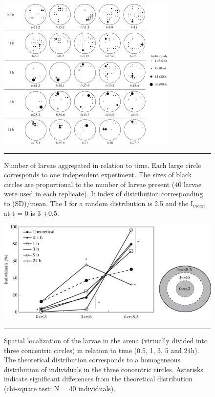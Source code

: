 \begin{figure}[h]
	\centering
		\includegraphics[width=0.9 \textwidth]{Figures/agreg_animbehav.pdf}
		\rule{35em}{0.5pt}
	\caption[Agregation]{Number of larvae aggregated in relation to time. Each large circle corresponds to one independent experiment. The sizes of black circles are proportional to the number of larvae present (40 larvae were used in each replicate). I: index of distribution corresponding to (SD)/mean. The I for a random distribution is 2.5 and the I$_{mean}$ at t = 0 is 3 $\pm$0.5.}
	\label{fig:agreg}

\end{figure}

\clearpage

\begin{figure}[t]
\centering
		\includegraphics[width=0.8 \textwidth]{Figures/rad_animbehav.png}
		\rule{35em}{0.5pt}
		\caption[Radial]{Spatial localization of the larvae in the arena (virtually divided into three concentric circles) in relation to time (0.5, 1, 3, 5 and 24h). The theoretical distribution corresponds to a homogeneous distribution of individuals in the three concentric circles. Asterisks indicate significant differences from the theoretical distribution \\(chi-square test: N = 40 individuals).}
	\label{fig:rad}
    

\end{figure}



